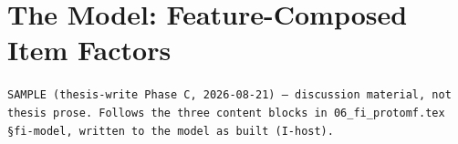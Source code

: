 \documentclass[11pt,a4paper]{article}
\begin{document}
\section*{The Model: Feature-Composed Item Factors}
{\scriptsize\color{gray}\texttt{SAMPLE (thesis-write Phase C, 2026-08-21) — discussion material, not thesis prose. Follows the three content blocks in 06\_fi\_protomf.tex \S fi-model, written to the model as built (I-host).}\par}
\vspace{1em}


\end{document}
